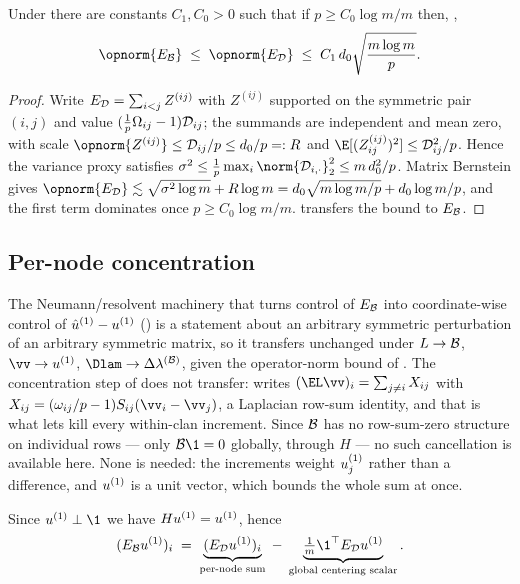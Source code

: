 \begin{lemma}\label{lem:dist-opnorm}
Under  there are constants $C_1,C_0>0$ such
that if $p\ge C_0\log m/m$ then, \hp,
\begin{equation}\label{eq:dist-opnorm}
   \opnorm{E_{\Bop}}\;\le\;\opnorm{E_{\Dmat}}\;\le\;C_1\,d_0\sqrt{\frac{m\log m}{p}}.
\end{equation}
\end{lemma}
\begin{proof}
Write $E_{\mathcal{D}}=\sum_{i<j}Z^{(ij)}$ with $Z^{(ij)}$ supported on the symmetric
pair $(i,j)$ and value $(\tfrac1p\Omega_{ij}-1)\mathcal{D}_{ij}$; the summands are
independent and mean zero, with scale
$\opnorm{Z^{(ij)}}\le\Dmat_{ij}/p\le d_0/p=:R$ and
$\E[(Z^{(ij)}_{ij})^2]\le\Dmat_{ij}^2/p$. Hence the variance proxy satisfies
$\sigma^2\le\tfrac1p\max_i\norm{\Dmat_{i,\cdot}}_2^2\le m\,d_0^2/p$. Matrix
Bernstein gives $\opnorm{E_{\Dmat}}\lesssim\sqrt{\sigma^2\log m}+R\log m
= d_0\sqrt{m\log m/p}+d_0\log m/p$, and the first term dominates once
$p\ge C_0\log m/m$.  transfers the bound to $E_{\mathcal{B}}$.
\end{proof}

\subsection{Per-node concentration}\label{app:dist-pernode}

The Neumann/resolvent machinery that turns control of $E_{\mathcal{B}}$ into
coordinate-wise control of $\hat u^{(1)}-u^{(1)}$
() is a statement about an
arbitrary symmetric perturbation of an arbitrary symmetric matrix, so it
transfers unchanged under $L\to\mathcal{B}$, $\vv\to\uone$, $\Dlam\to\DlamB$, given the
operator-norm bound of . The concentration step of
 does not transfer:  writes
$(\EL\vv)_i=\sum_{j\ne i}X_{ij}$ with
$X_{ij}=(\omega_{ij}/p-1)S_{ij}(\vv_i-\vv_j)$, a Laplacian row-sum identity, and
that is what lets  kill every within-clan increment. Since
$\mathcal{B}$ has no row-sum-zero structure on individual rows --- only $\Bop\1=0$
globally, through $H$ --- no such cancellation is available here. None is needed:
the increments weight $u^{(1)}_j$ rather than a difference, and $u^{(1)}$ is a unit
vector, which bounds the whole sum at once.

Since $\uone\perp\1$ we have $Hu^{(1)}=u^{(1)}$, hence
\begin{equation}\label{eq:dist-split}
   (E_{\Bop}\uone)_i
   \;=\; \underbrace{(E_{\Dmat}\uone)_i}_{\text{per-node sum}}
   \;-\; \underbrace{\tfrac1m\1^\top E_{\Dmat}\uone}_{\text{global centering scalar}}.
\end{equation}

